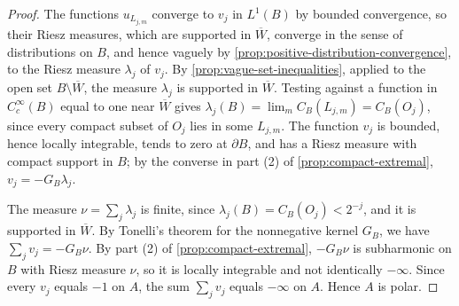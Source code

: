 \begin{proof}
The functions $u_{L_{j,m}}$ converge to $v_j$ in $L^1(B)$ by bounded convergence, so their Riesz measures, which are supported in $\overline W$, converge in the sense of distributions on $B$, and hence vaguely by \cref{prop:positive-distribution-convergence}, to the Riesz measure $\lambda_j$ of $v_j$. By \cref{prop:vague-set-inequalities}, applied to the open set $B\setminus\overline W$, the measure $\lambda_j$ is supported in $\overline W$. Testing against a function in $C_c^\infty(B)$ equal to one near $\overline W$ gives $\lambda_j(B)=\lim_mC_B(L_{j,m})=C_B(O_j)$, since every compact subset of $O_j$ lies in some $L_{j,m}$. The function $v_j$ is bounded, hence locally integrable, tends to zero at $\partial B$, and has a Riesz measure with compact support in $B$; by the converse in part (2) of \cref{prop:compact-extremal}, $v_j=-G_B\lambda_j$.

The measure $\nu=\sum_j\lambda_j$ is finite, since $\lambda_j(B)=C_B(O_j)<2^{-j}$, and it is supported in $\overline W$. By Tonelli's theorem for the nonnegative kernel $G_B$, we have $\sum_jv_j=-G_B\nu$. By part (2) of \cref{prop:compact-extremal}, $-G_B\nu$ is subharmonic on $B$ with Riesz measure $\nu$, so it is locally integrable and not identically $-\infty$. Since every $v_j$ equals $-1$ on $A$, the sum $\sum_jv_j$ equals $-\infty$ on $A$. Hence $A$ is polar.
\end{proof}

